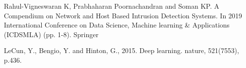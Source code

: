 \documentclass[conference]{IEEEtran}
\begin{document}
\begin{thebibliography}{00}
 Rahul-Vigneswaran K, Prabhaharan Poornachandran and Soman KP. A Compendium on Network and Host Based Intrusion Detection Systems. In 2019 International Conference on Data Science, Machine learning \& Applications (ICDSMLA) (pp. 1-8). Springer

 LeCun, Y., Bengio, Y. and Hinton, G., 2015. Deep learning. nature, 521(7553), p.436.



\end{thebibliography}
\end{document}
